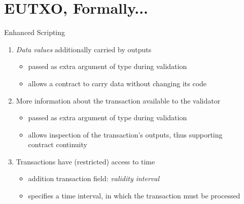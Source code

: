 \section{EUTXO, Formally...}

\begin{frame}{Enhanced Scripting}

\begin{enumerate}
\item \textit{Data values} additionally carried by outputs
  \begin{itemize}
  \item passed as extra argument of type  during validation
  \item allows a contract to carry data without changing its code
  \end{itemize}
\item More information about the transaction available to the validator
  \begin{itemize}
  \item passed as extra argument of type  during validation
  \item allows inspection of the transaction's outputs, thus supporting\\ \alert{contract continuity}
  \end{itemize}
\item Transactions have (restricted) access to time
  \begin{itemize}
  \item addition transaction field: \textit{validity interval}
  \item specifies a time interval, in which the transaction must be processed
  \end{itemize}
\end{enumerate}

\end{frame}

